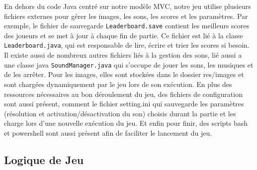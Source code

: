 \documentclass{article}
\begin{document}
    En dehors du code Java centré sur notre modèle MVC, notre jeu utilise plusieurs fichiers externes pour gérer les images, les sons, les scores et les paramètres.
    Par exemple, le fichier de sauvegarde \texttt{Leaderboard.save} contient les meilleurs scores des joueurs et se met à jour à chaque fin de partie.
    Ce fichier est lié à la classe \texttt{Leaderboard.java}, qui est responsable de lire, écrire et trier les scores si besoin.
    Il existe aussi de nombreux autres fichiers liés à la gestion des sons, lié aussi a une classe java \texttt{SoundManager.java} qui s'occupe de jouer les sons, les musiques et de les arrêter.
    Pour les images, elles sont stockées dans le dossier res/images et sont chargées dynamiquement par le jeu lors de son exécution.
    En plus des ressources nécessaires au bon déroulement du jeu, des fichiers de configuration sont aussi présent, comment le fichier setting.ini qui sauvegarde les paramètres (résolution et activation/désactivation du son) choisis durant la partie et les charge lors d'une nouvelle exécution du jeu.
    Et enfin pour finir, des scripts bash et powershell sont aussi présent afin de faciliter le lancement du jeu.


    \subsection{Logique de Jeu}\label{subsec:logique-de-jeu}
\end{document}
